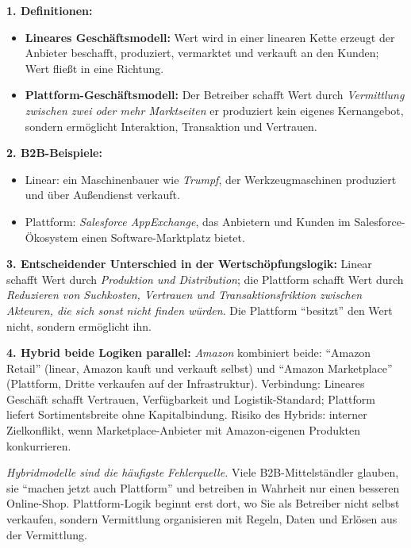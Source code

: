 \documentclass[11pt,a4paper,oneside]{article}
\begin{document}
\begin{loesungbox}
\textbf{1. Definitionen:}
\begin{itemize}
  \item \textbf{Lineares Geschäftsmodell:} Wert wird in einer linearen Kette erzeugt \textendash{} der Anbieter beschafft, produziert, vermarktet und verkauft an den Kunden; Wert fließt in eine Richtung.
  \item \textbf{Plattform-Geschäftsmodell:} Der Betreiber schafft Wert durch \emph{Vermittlung zwischen zwei oder mehr Marktseiten} \textendash{} er produziert kein eigenes Kernangebot, sondern ermöglicht Interaktion, Transaktion und Vertrauen.
\end{itemize}

\textbf{2. B2B-Beispiele:}
\begin{itemize}
  \item Linear: ein Maschinenbauer wie \emph{Trumpf}, der Werkzeugmaschinen produziert und über Außendienst verkauft.
  \item Plattform: \emph{Salesforce AppExchange}, das Anbietern und Kunden im Salesforce-Ökosystem einen Software-Marktplatz bietet.
\end{itemize}

\textbf{3. Entscheidender Unterschied in der Wertschöpfungslogik:}
Linear schafft Wert durch \emph{Produktion und Distribution}; die Plattform schafft Wert durch \emph{Reduzieren von Suchkosten, Vertrauen und Transaktionsfriktion zwischen Akteuren, die sich sonst nicht finden würden}. Die Plattform ``besitzt'' den Wert nicht, sondern ermöglicht ihn.

\textbf{4. Hybrid \textendash{} beide Logiken parallel:}
\emph{Amazon} kombiniert beide: ``Amazon Retail'' (linear, Amazon kauft und verkauft selbst) und ``Amazon Marketplace'' (Plattform, Dritte verkaufen auf der Infrastruktur). Verbindung: Lineares Geschäft schafft Vertrauen, Verfügbarkeit und Logistik-Standard; Plattform liefert Sortimentsbreite ohne Kapitalbindung. Risiko des Hybrids: interner Zielkonflikt, wenn Marketplace-Anbieter mit Amazon-eigenen Produkten konkurrieren.

\begin{merkbox}[Managementhinweis]
\emph{Hybridmodelle sind die häufigste Fehlerquelle.} Viele B2B-Mittelständler glauben, sie ``machen jetzt auch Plattform'' und betreiben in Wahrheit nur einen besseren Online-Shop. Plattform-Logik beginnt erst dort, wo Sie als Betreiber nicht selbst verkaufen, sondern Vermittlung organisieren \textendash{} mit Regeln, Daten und Erlösen aus der Vermittlung.
\end{merkbox}
\end{loesungbox}
\end{document}
